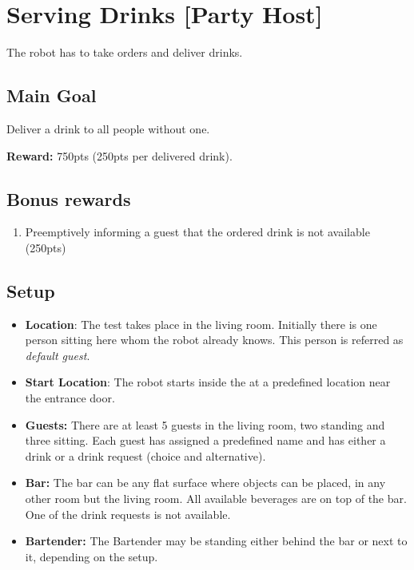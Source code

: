 \section{Serving Drinks [Party Host]}
\label{test:serving-drinks}
The robot has to take orders and deliver drinks.



\subsection*{Main Goal}
Deliver a drink to all people without one.

\noindent\textbf{Reward:} 750pts (250pts per delivered drink).

\subsection*{Bonus rewards}
\begin{enumerate}[nosep]
	\item Preemptively informing a guest that the ordered drink is not available (250pts)
\end{enumerate}

\subsection*{Setup}
\begin{itemize}
	\item \textbf{Location}: The test takes place in the living room.
	Initially there is one person sitting here whom the robot already knows.
	This person is referred as \emph{default guest}.

	\item \textbf{Start Location}: The robot starts inside the \Arena{} at a predefined location near the entrance door.

	\item \textbf{Guests:} There are at least 5 guests in the living room, two standing and three sitting.
	Each guest has assigned a predefined name and has either a drink or a drink request (choice and alternative).

	\item \textbf{Bar:} The bar can be any flat surface where objects can be placed, in any other room but the living room.
	All available beverages are on top of the bar.
	One of the drink requests is not available.

	\item \textbf{Bartender:} The Bartender may be standing either behind the bar or next to it, depending on the \Arena{} setup.
\end{itemize}



